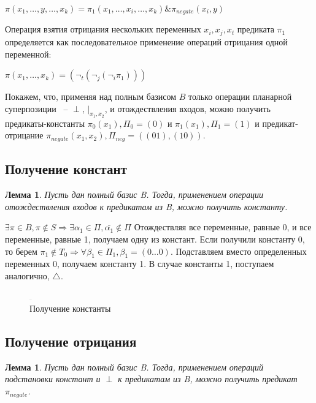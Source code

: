 \documentclass[12pt]{article}
\newtheorem{lemma}[theorem]{Лемма}
\newenvironment{proof}[1][Доказательство]{\begin{trivlist}
\item[\hskip \labelsep {\bfseries #1}]}{\end{trivlist}}
\begin{document}
$\pi(x_1, \dots, y, \dots, x_k) = \pi_1(x_1, \dots, x_i, \dots, x_k) \& \pi_{negate}(x_i, y)$

Операция взятия отрицания нескольких переменных $x_i, x_j, x_t$ предиката $\pi_1$
определяется как последовательное применение операций отрицания одной переменной:

$\pi(x_1, \dots, x_k) = (\neg_t (\neg_j (\neg_i \pi_1)))$

Покажем, что, применяя над полным базисом $B$ только операции планарной суперпозиции ~-- $\perp$, $|_{x_1, x_2}$,
и отождествления входов, можно получить предикаты-константы
$\pi_0(x_1), \Pi_0=(0)$ и $\pi_1(x_1), \Pi_1=(1)$ и предикат-отрицание $\pi_{negate}(x_1, x_2), \Pi_{neg}=( (01), (10) )$.

\subsection{Получение констант}
\begin{lemma}
\label{eq:const}
Пусть дан полный базис B. Тогда, применением операции отождествления входов к предикатам из B,
можно получить константу.
\end{lemma}

\begin{proof}
$\exists \pi \in B, \pi \notin S \Rightarrow \exists \alpha_1 \in \Pi, \bar{\alpha_1} \notin \Pi$
Отождествляя все переменные, равные 0, и все переменные, равные 1, получаем одну из констант.
Если получили константу 0, то берем $\pi_1 \notin T_0 \Rightarrow \forall \beta_1 \in \Pi_1, \beta_1=(0 \ldots 0)$. 
Подставляем вместо определенных переменных 0, получаем константу 1. 
В случае константы 1, поступаем аналогично, $\bigtriangleup$.
\end{proof}
\begin{figure}[htb]
\centering
\includegraphics[width=0.01\textwidth]{3_2to3.png}
\caption{Получение константы}
\label{fig:constant}
\end{figure}

\subsection{Получение отрицания}
\begin{lemma}
\label{eq:negate}
Пусть дан полный базис B. Тогда, применением операций подстановки констант
и $\perp$ к предикатам из B, можно получить предикат $\pi_{negate}$.
\end{lemma}
\end{document}
